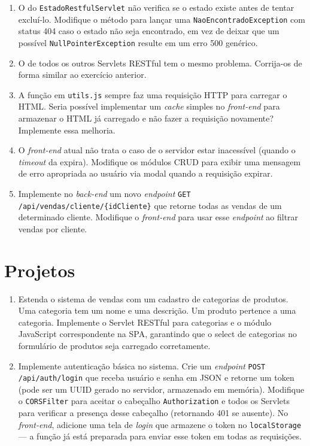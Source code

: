 \begin{enumerate}

    \item O  do \texttt{EstadoRestfulServlet} não verifica se o estado existe antes de tentar excluí-lo. Modifique o método para lançar uma \texttt{NaoEncontradoException} com status 404 caso o estado não seja encontrado, em vez de deixar que um possível \texttt{NullPointerException} resulte em um erro 500 genérico.

    \item O  de todos os outros Servlets RESTful tem o mesmo problema. Corrija-os de forma similar ao exercício anterior.

    \item A função  em \texttt{utils.js} sempre faz uma requisição HTTP para carregar o HTML. Seria possível implementar um \textit{cache} simples no \textit{front-end} para armazenar o HTML já carregado e não fazer a requisição novamente? Implemente essa melhoria.

    \item O \textit{front-end} atual não trata o caso de o servidor estar inacessível (quando o \textit{timeout} da  expira). Modifique os módulos CRUD para exibir uma mensagem de erro apropriada ao usuário via modal quando a requisição expirar.

    \item Implemente no \textit{back-end} um novo \textit{endpoint} \texttt{GET /api/vendas/cliente/\{idCliente\}} que retorne todas as vendas de um determinado cliente. Modifique o \textit{front-end} para usar esse \textit{endpoint} ao filtrar vendas por cliente.

\end{enumerate}

\section{Projetos}

\begin{enumerate}
    \item Estenda o sistema de vendas com um cadastro de categorias de produtos. Uma categoria tem um nome e uma descrição. Um produto pertence a uma categoria. Implemente o Servlet RESTful para categorias e o módulo JavaScript correspondente na SPA, garantindo que o select de categorias no formulário de produtos seja carregado corretamente.

    \item Implemente autenticação básica no sistema. Crie um \textit{endpoint} \texttt{POST /api/auth/login} que receba usuário e senha em JSON e retorne um token (pode ser um UUID gerado no servidor, armazenado em memória). Modifique o \texttt{CORSFilter} para aceitar o cabeçalho \texttt{Authorization} e todos os Servlets para verificar a presença desse cabeçalho (retornando 401 se ausente). No \textit{front-end}, adicione uma tela de \textit{login} que armazene o token no \texttt{localStorage} --- a função  já está preparada para enviar esse token em todas as requisições.
\end{enumerate}
